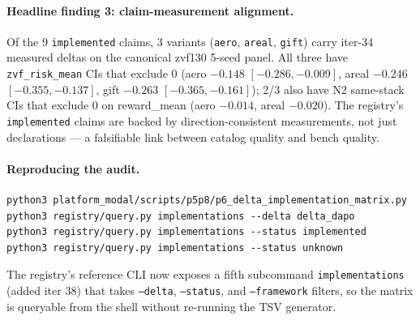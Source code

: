 \documentclass{article}
\begin{document}
\paragraph{Headline finding 3: claim-measurement alignment.}
Of the 9 \texttt{implemented} claims, 3 variants
(\texttt{aero}, \texttt{areal}, \texttt{gift}) carry iter-34 measured
deltas on the canonical zvf130 5-seed panel. All three have
\texttt{zvf\_risk\_mean} CIs that exclude 0 (aero $-0.148$
$[-0.286, -0.009]$, areal $-0.246$ $[-0.355, -0.137]$, gift $-0.263$
$[-0.365, -0.161]$); 2/3 also have N2 same-stack CIs that exclude 0
on reward\_mean (aero $-0.014$, areal $-0.020$). The registry's
\texttt{implemented} claims are backed by direction-consistent
measurements, not just declarations --- a falsifiable link between
catalog quality and bench quality.

\paragraph{Reproducing the audit.}
\begin{verbatim}
python3 platform_modal/scripts/p5p8/p6_delta_implementation_matrix.py
python3 registry/query.py implementations --delta delta_dapo
python3 registry/query.py implementations --status implemented
python3 registry/query.py implementations --status unknown
\end{verbatim}
The registry's reference CLI now exposes a fifth subcommand
\texttt{implementations} (added iter 38) that takes
\texttt{--delta}, \texttt{--status}, and \texttt{--framework} filters,
so the matrix is queryable from the shell without re-running the TSV
generator.
\end{document}
